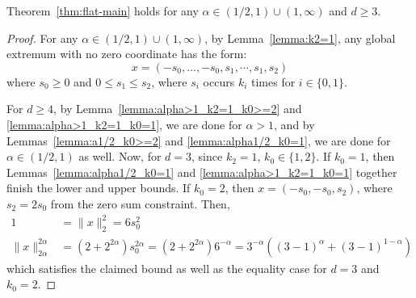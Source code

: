 \documentclass[11pt]{article}
\begin{document}
\begin{lemma}
Theorem~\ref{thm:flat-main} holds for any $\alpha \in (1/2,1)\cup (1,\infty)$ and $d\geq 3$. 
\end{lemma}
\begin{proof}
    For any $\alpha \in (1/2,1)\cup(1,\infty)$, by Lemma~\ref{lemma:k2=1}, any global extremum with no zero coordinate has the form:
    $$x=(-s_0,\dots,-s_0,s_1,\cdots,s_1,s_2)$$
    where $s_0\geq 0$ and $0\leq s_1\leq s_2$, where $s_i$ occurs $k_i$ times for $i\in \{0,1\}$. 
    
    For $d\geq 4$, by Lemma~\ref{lemma:alpha>1_k2=1_k0>=2} and \ref{lemma:alpha>1_k2=1_k0=1}, we are done for $\alpha > 1$, and by Lemmas~\ref{lemma:a1/2_k0>=2} and \ref{lemma:alpha1/2_k0=1}, we are done for $\alpha \in (1/2, 1)$ as well. Now, for $d=3$, since $k_2=1$, $k_0\in \{1,2\}$. If $k_0=1$, then Lemmas~\ref{lemma:alpha1/2_k0=1} and \ref{lemma:alpha>1_k2=1_k0=1} together finish the lower and upper bounds. If $k_0=2$, then $x=(-s_0,-s_0,s_2)$, where $s_2=2s_0$ from the zero sum constraint. Then, 
    \begin{align*}
        1&=\|x\|^2_2=6s_0^2 \\
        \|x\|_{2\alpha}^{2\alpha}&=(2+2^{2\alpha})s_0^{2\alpha}=(2+2^{2\alpha})6^{-\alpha}=3^{-\alpha}((3-1)^\alpha+(3-1)^{1-\alpha})
    \end{align*}
    which satisfies the claimed bound as well as the equality case for $d=3$ and $k_0=2$. 


\end{proof}
\end{document}

